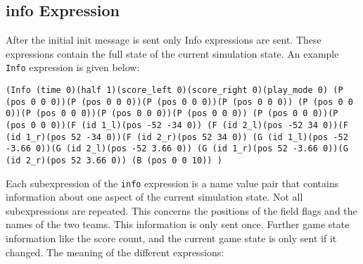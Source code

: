 \subsection{info Expression}

After the initial init message is sent only Info expressions are sent.
These expressions contain the full state of the current simulation
state. An example \texttt{Info} expression is given below:

\begin{verbatim}
(Info (time 0)(half 1)(score_left 0)(score_right 0)(play_mode 0) (P
(pos 0 0 0))(P (pos 0 0 0))(P (pos 0 0 0))(P (pos 0 0 0)) (P (pos 0 0
0))(P (pos 0 0 0))(P (pos 0 0 0))(P (pos 0 0 0)) (P (pos 0 0 0))(P
(pos 0 0 0))(F (id 1_l)(pos -52 -34 0)) (F (id 2_l)(pos -52 34 0))(F
(id 1_r)(pos 52 -34 0))(F (id 2_r)(pos 52 34 0)) (G (id 1_l)(pos -52
-3.66 0))(G (id 2_l)(pos -52 3.66 0)) (G (id 1_r)(pos 52 -3.66 0))(G
(id 2_r)(pos 52 3.66 0)) (B (pos 0 0 10)) )
\end{verbatim}

Each subexpression of the \texttt{info} expression is a name value
pair that contains information about one aspect of the current
simulation state.  Not all subexpressions are repeated. This concerns
the positions of the field flags and the names of the two teams. This
information is only sent once. Further game state information like the
score count, and the current game state is only sent if it changed.
The meaning of the different expressions:

